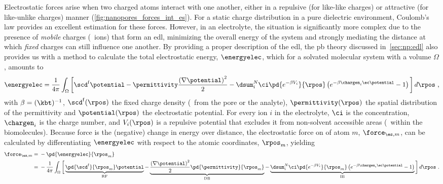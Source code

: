 Electrostatic forces arise when two charged atoms interact with one another, either in a repulsive (for
like-like charges) or attractive (for like-unlike charges) manner (\cref{fig:nanopores_forces_int_es}). For a
static charge distribution in a pure dielectric environment, Coulomb's law provides an excellent estimation
for these forces. However, in an electrolyte, the situation is significantly more complex due to the presence
of \emph{mobile} charges (\ie~ions) that form an \gls{edl}, minimizing the overall energy of the system and
strongly mediating the distance at which \emph{fixed} charges can still influence one another. By providing a
proper description of the \gls{edl}, the \gls{pb} theory discussed in~\cref{sec:np:edl} also provides us with
a method to calculate the total electrostatic energy, $\energyelec$, which for a solvated molecular system
with a volume $\Omega$, amounts to~\cite{Gilson-1993,Im-1998,Baker-2005}
%
\begin{align}\label{eq:nanopores_electrostatic_energy}
  \energyelec = 
  \dfrac{1}{4 \pi} \int_{\Omega}
  \bigg[
    \scd^{\rm{f}} \potential
    - \permittivity \dfrac{\left(\nabla \potential \right)^2}{2}
    - \dsum_{i}^{N} \ci \pd{ e^{- \beta V_i} }{\rpos}
                    \left( e^{ - \beta \chargen_i \ec \potential } - 1 \right)
  \bigg] \, d\rpos
  \text{ ,}
\end{align}
%
with $\beta = (\kbt)^{-1}$, $\scd^{\rm{f}}(\rpos)$ the fixed charge density (\ie~from the pore or the
analyte), $\permittivity(\rpos)$ the spatial distribution of the permittivity and $\potential(\rpos)$ the
electrostatic potential. For every ion $i$ in the electrolyte, $\ci$ is the concentration, $\chargen_i$ is the
charge number, and $V_i(\rpos)$ is a repulsive potential that excludes it from non-solvent accessible areas
(\eg~within the biomolecules). Because force is the (negative) change in energy over distance, the
electrostatic force on of atom $m$, $\force_{\es,m}$, can be calculated by differentiating $\energyelec$ with
respect to the atomic coordinates, $\rpos_m$, yielding~\cite{Gilson-1993,Im-1998,Baker-2005}
%
\begin{align}\label{eq:nanopores_electrostatic_force}
  \force_{\es,m} ={}& - \pd{\energyelec}{\rpos_m} \notag \\
    ={}& - \dfrac{1}{4 \pi} \int_{\Omega} \bigg[ 
      \underbrace{ \pd{\scd^{\rm{f}}}{\rpos_m} \potential }_{ \text{RF} }
      - \underbrace{ \dfrac{\left(\nabla \potential \right)^2}{2} 
      \pd{\permittivity}{\rpos_m} }_{ \text{DB} }
      - \underbrace{ \dsum_{i}^{N}
          \ci \pd{ e^{- \beta V_i} }{\rpos_m}
          \left( e^{ - \beta \chargen_i \ec \potential } - 1 \right) }_{ \text{IB} }
          \bigg] \, d\rpos
  \text{ .}
\end{align}
